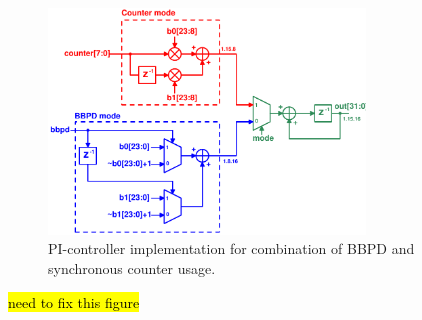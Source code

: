 			\begin{figure}[htb!]
			        \centering
			        \includegraphics[width=0.75\textwidth, angle=0]{./figs/mux_datapath}
			    \caption{PI-controller implementation for combination of BBPD and synchronous counter usage.}
			    \label{fig:pi_dig_imp}
			\end{figure}
			\hl{need to fix this figure}







